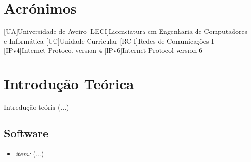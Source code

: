 
 
	
	
	
	
	
	

\renewcommand{\contentsname}{Índice}
\tableofcontents
\listoffigures
{}


\chapter*{Acrónimos}
\begin{acronym}

[UA]{Universidade de Aveiro}
[LECI]{Licenciatura em Engenharia de Computadores e Informática}
[UC]{Unidade Curricular}
[RC-I]{Redes de Comunicações I}
[IPv4]{Internet Protocol version 4}
[IPv6]{Internet Protocol version 6}
\end{acronym}


\pagestyle{fancy}
\fancyhf{}
\rhead{\titulo}
\cfoot{\thepage}


\chapter{Introdução Teórica}
\label{chap.Intro}
\begin{multicols}{2}

Introdução teória (...)
 
\end{multicols}

\section{Software}
\label{sec.software}



\begin{itemize}
	\item \textsl{item:} (...)
\end{itemize}

